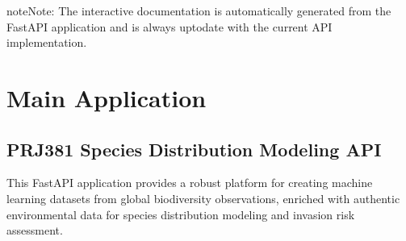 \documentclass[letterpaper,10pt,english]{sphinxmanual}
\begin{document}
\begin{sphinxadmonition}{note}{Note:}
\sphinxAtStartPar
The interactive documentation is automatically generated from the FastAPI application and is always up\sphinxhyphen{}to\sphinxhyphen{}date with the current API implementation.
\end{sphinxadmonition}


\section{Main Application}
\label{\detokenize{api_reference:module-app.main}}\label{\detokenize{api_reference:main-application}}

\subsection{PRJ381 Species Distribution Modeling API}
\label{\detokenize{api_reference:prj381-species-distribution-modeling-api}}
\sphinxAtStartPar
This FastAPI application provides a robust platform for creating machine learning datasets from global biodiversity observations, enriched with authentic environmental data for species distribution modeling and invasion risk assessment.
\end{document}
